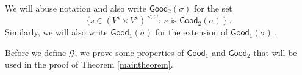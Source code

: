 \documentclass[10pt,a4paper, openany,  oldfontcommands]{memoir}
\newtheorem{open problem} [theorem] {Open Problem}
\begin{document}
We will abuse notation and also write  $  \mathsf{Good}_2  \left(   \sigma  \right)  $  for the set  
\[
\Big\{  
 s   \in  \left(  V^{ \star  }   \times   V^{ \star  }    \right)^{  <  \omega  }    :    \    s   \mbox{  is   }     \mathsf{Good}_2  \left(   \sigma  \right)  
   \,  
 \Big\}
\     .
\]
Similarly,  we will also  write     $  \mathsf{Good}_1  \left(   \sigma  \right)  $ for the extension of  
  $  \mathsf{Good}_1  \left(   \sigma  \right)   \,   $.
  
  
  
  
  
Before we define  $  \mathcal{G} $, we prove  some properties of   $  \mathsf{Good}_1 $   and   $  \mathsf{Good}_2 $ that will be used in the proof of  Theorem  \ref{maintheorem}. 
\end{document}

